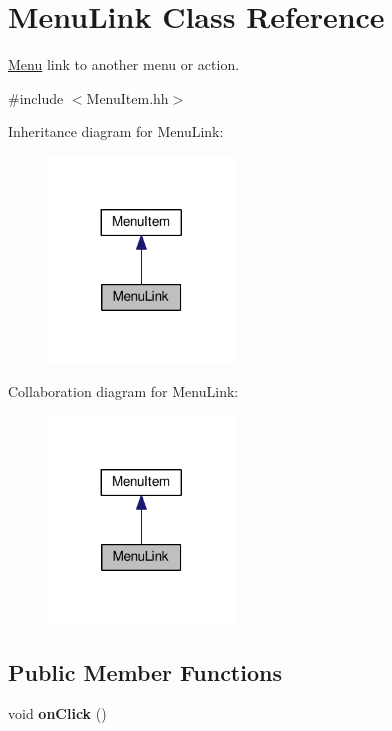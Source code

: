 \hypertarget{classMenuLink}{}\section{Menu\+Link Class Reference}
\label{classMenuLink}


\hyperlink{classMenu}{Menu} link to another menu or action.  




{\ttfamily \#include $<$Menu\+Item.\+hh$>$}



Inheritance diagram for Menu\+Link\+:\nopagebreak
\begin{figure}[H]
\begin{center}
\leavevmode
\includegraphics[width=140pt]{classMenuLink__inherit__graph}
\end{center}
\end{figure}


Collaboration diagram for Menu\+Link\+:\nopagebreak
\begin{figure}[H]
\begin{center}
\leavevmode
\includegraphics[width=140pt]{classMenuLink__coll__graph}
\end{center}
\end{figure}
\subsection*{Public Member Functions}
\begin{DoxyCompactItemize}
\item 
void {\bfseries on\+Click} ()\hypertarget{classMenuLink_a1242857c995165ecd13228f91662efc3}{}\label{classMenuLink_a1242857c995165ecd13228f91662efc3}

\end{DoxyCompactItemize}
